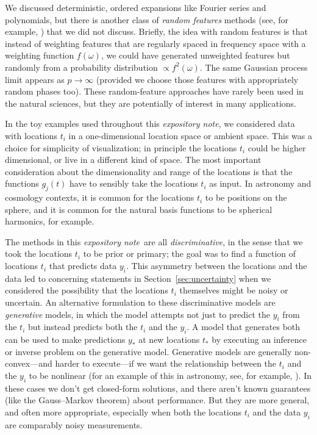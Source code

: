 \documentclass[12pt,letterpaper]{article}
\newcommand{\documentname}{\textsl{expository note}}
\newcommand{\sectionname}{Section}
\begin{document}
We discussed deterministic, ordered expansions like Fourier series and polynomials, but there is another class of \emph{random features} methods (see, for example, \citealt{rahimi2007random}) that we did not discuss.
Briefly, the idea with random features is that instead of weighting features that are regularly spaced in frequency space with a weighting function $f(\omega)$, we could have generated unweighted features but randomly from a probability distribution $\propto f^2(\omega)$.
The same Gaussian process limit appears as $p\to\infty$ (provided we choose those features with appropriately random phases too).
These random-feature approaches have rarely been used in the natural sciences, but they are potentially of interest in many applications.

In the toy examples used throughout this \documentname, we considered data with locations $t_i$ in a one-dimensional location space or ambient space.
This was a choice for simplicity of visualization; in principle the locations $t_i$ could be higher dimensional, or live in a different kind of space.
The most important consideration about the dimensionality and range of the locations is that the functions $g_j(t)$ have to sensibly take the locations $t_i$ as input.
In astronomy and cosmology contexts, it is common for the locations $t_i$ to be positions on the sphere, and it is common for the natural basis functions to be spherical harmonics, for example.

The methods in this \documentname\ are all \emph{discriminative}, in the sense that we took the locations $t_i$ to be prior or primary;
the goal was to find a function of locations $t_i$ that predicts data $y_i$.
This asymmetry between the locations and the data led to concerning statements in \sectionname~\ref{sec:uncertainty} when we considered the possibility that the locations $t_i$ themselves might be noisy or uncertain.
An alternative formulation to these discriminative models are \emph{generative} models, in which the model attempts not just to predict the $y_i$ from the $t_i$ but instead predicts both the $t_i$ and the $y_i$.
A model that generates both can be used to make predictions $y_\ast$ at new locations $t_\ast$ by executing an inference or inverse problem on the generative model.
Generative models are generally non-convex---and harder to execute---if we want the relationship between the $t_i$ and the $y_i$ to be nonlinear (for an example of this in astronomy, see, for example, \citealt{thecannon}).
In these cases we don't get closed-form solutions, and there aren't known guarantees (like the Gauss--Markov theorem) about performance.
But they are more general, and often more appropriate, especially when both the locations $t_i$ and the data $y_i$ are comparably noisy measurements.
\end{document}
